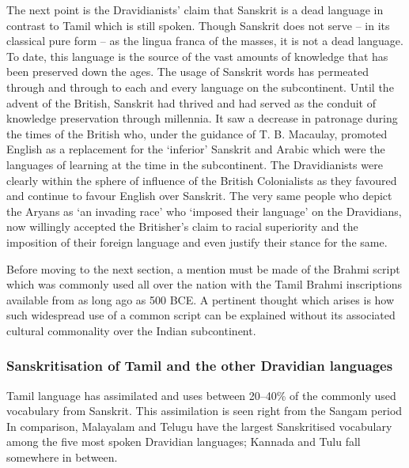 The next point is the Dravidianists’ claim that Sanskrit is a dead language in contrast to Tamil which is still spoken. Though Sanskrit does not serve – in its classical pure form – as the lingua franca of the masses, it is not a dead language. To date, this language is the source of the vast amounts of knowledge that has been preserved down the ages. The usage of Sanskrit words has permeated through and through to each and every language on the subcontinent. Until the advent of the British, Sanskrit had thrived and had served as the conduit of knowledge preservation through millennia. It saw a decrease in patronage during the times of the British who, under the guidance of T. B. Macaulay, promoted English as a replacement for the ‘inferior’ Sanskrit and Arabic which were the languages of learning at the time in the subcontinent. The Dravidianists were clearly within the sphere of influence of the British Colonialists as they favoured and continue to favour English over Sanskrit. The very same people who depict the Aryans as ‘an invading race’ who ‘imposed their language’ on the Dravidians, now willingly accepted the Britisher’s claim to racial superiority and the imposition of their foreign language and even justify their stance for the same.

\vskip 3.5pt

Before moving to the next section, a mention must be made of the Brahmi script which was commonly used all over the nation with the Tamil Brahmi inscriptions available from as long ago as 500 BCE. A pertinent thought which arises is how such widespread use of a common script can be explained without its associated cultural commonality over the Indian subcontinent.


\subsubsection*{Sanskritisation of Tamil and the other Dravidian languages}

\vskip -8pt

Tamil language has assimilated and uses between 20–40\% of the commonly used vocabulary from Sanskrit. This assimilation is seen right from the Sangam period In comparison, Malayalam and Telugu have the largest Sanskritised vocabulary among the five most spoken Dravidian languages; Kannada and Tulu fall somewhere in between.

